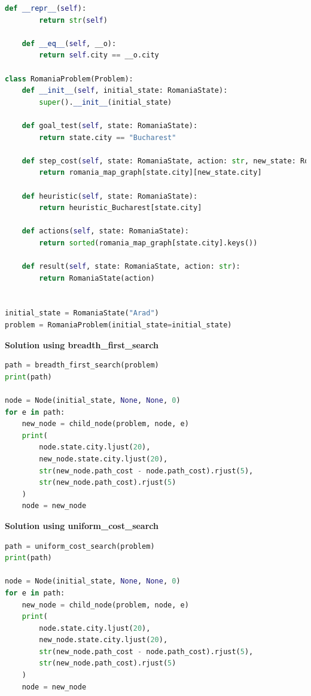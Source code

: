 \begin{lstlisting}[language=Python]
    def __repr__(self):
        return str(self)
    
    def __eq__(self, __o):
        return self.city == __o.city

class RomaniaProblem(Problem):
    def __init__(self, initial_state: RomaniaState):
        super().__init__(initial_state)
    
    def goal_test(self, state: RomaniaState):
        return state.city == "Bucharest"
    
    def step_cost(self, state: RomaniaState, action: str, new_state: RomaniaState):
        return romania_map_graph[state.city][new_state.city]
    
    def heuristic(self, state: RomaniaState):
        return heuristic_Bucharest[state.city]
    
    def actions(self, state: RomaniaState):
        return sorted(romania_map_graph[state.city].keys())
    
    def result(self, state: RomaniaState, action: str):
        return RomaniaState(action)


initial_state = RomaniaState("Arad")
problem = RomaniaProblem(initial_state=initial_state)
\end{lstlisting}



{\centering \textbf{Solution using breadth\_first\_search} \par}

\begin{lstlisting}[language=Python]
path = breadth_first_search(problem)
print(path)

node = Node(initial_state, None, None, 0)
for e in path:
    new_node = child_node(problem, node, e)
    print(
        node.state.city.ljust(20), 
        new_node.state.city.ljust(20), 
        str(new_node.path_cost - node.path_cost).rjust(5), 
        str(new_node.path_cost).rjust(5)
    )
    node = new_node
\end{lstlisting}


{\centering \textbf{Solution using uniform\_cost\_search} \par}

\begin{lstlisting}[language=Python]
path = uniform_cost_search(problem)
print(path)

node = Node(initial_state, None, None, 0)
for e in path:
    new_node = child_node(problem, node, e)
    print(
        node.state.city.ljust(20), 
        new_node.state.city.ljust(20), 
        str(new_node.path_cost - node.path_cost).rjust(5), 
        str(new_node.path_cost).rjust(5)
    )
    node = new_node
\end{lstlisting}



